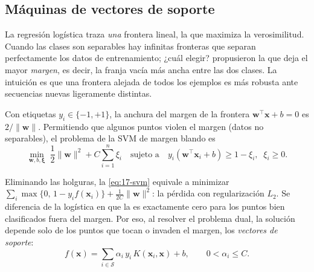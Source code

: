 \subsection{Máquinas de vectores de soporte}

La regresión logística traza \emph{una} frontera lineal, la que maximiza la verosimilitud. Cuando las clases son separables hay infinitas fronteras que separan perfectamente los datos de entrenamiento; ¿cuál elegir? \textcite{c17-cortes1995} propusieron la que deja el mayor \emph{margen}, es decir, la franja vacía más ancha entre las dos clases. La intuición es que una frontera alejada de todos los ejemplos es más robusta ante secuencias nuevas ligeramente distintas.

Con etiquetas $y_i\in\{-1,+1\}$, la anchura del margen de la frontera $\mathbf{w}^\top\mathbf{x}+b=0$ es $2/\|\mathbf{w}\|$. Permitiendo que algunos puntos violen el margen (datos no separables), el problema de la SVM de margen blando es
\begin{equation}\label{eq:17-svm}
\min_{\mathbf{w},b,\boldsymbol\xi}\; \frac12\|\mathbf{w}\|^2 + C\sum_{i=1}^{n}\xi_i
\quad\text{sujeto a}\quad y_i(\mathbf{w}^\top\mathbf{x}_i+b)\ge 1-\xi_i,\;\; \xi_i\ge 0.
\end{equation}

\begin{simbolos}
\end{simbolos}

Eliminando las holguras, la \cref{eq:17-svm} equivale a minimizar $\sum_i\max\{0,\,1-y_if(\mathbf{x}_i)\} + \frac{1}{2C}\|\mathbf{w}\|^2$: la pérdida  con regularización $L_2$. Se diferencia de la logística en que la  es exactamente cero para los puntos bien clasificados fuera del margen. Por eso, al resolver el problema dual, la solución depende solo de los puntos que tocan o invaden el margen, los \emph{vectores de soporte}:
\begin{equation}\label{eq:17-dual}
f(\mathbf{x}) = \sum_{i\in\mathcal{S}} \alpha_i\,y_i\,K(\mathbf{x}_i,\mathbf{x}) + b,\qquad 0<\alpha_i\le C.
\end{equation}

\begin{simbolos}
\end{simbolos}

